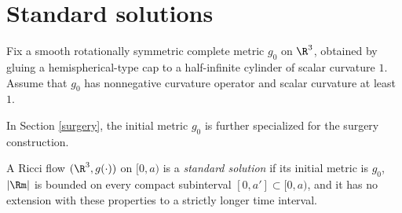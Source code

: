 \section{Standard solutions}

 \label{II.2}

Fix a smooth rotationally symmetric complete metric $g_0$ on $\R^3$, obtained by
gluing a hemispherical-type cap to a half-infinite cylinder of scalar curvature
$1$. Assume that $g_0$ has nonnegative curvature operator and scalar curvature
at least $1$.

\begin{remark}
  \label{rem:kl-standard-solutions-structural-remark-standard-solutions}

In Section \ref{surgery}, the initial metric $g_0$ is further specialized for
the surgery construction.
\end{remark}

\begin{definition}
  \label{def:kl-standard-solutions-standard-solution-definition}

\label{defstandardsolution}
A Ricci flow $(\R^3,g(\cdot))$ on $[0,a)$ is a \emph{standard solution} if its
initial metric is $g_0$, $|\Rm|$ is bounded on every compact subinterval
$[0,a']\subset[0,a)$, and it has no extension with these properties to a
strictly longer time interval.
\end{definition}


